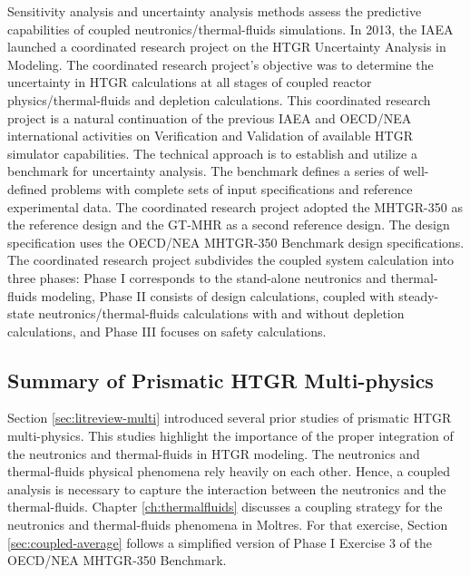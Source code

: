 Sensitivity analysis and uncertainty analysis methods assess the predictive capabilities of coupled neutronics/thermal-fluids simulations.
In 2013, the IAEA launched a coordinated research project \cite{tyobeka_htgr_2011} on the HTGR Uncertainty Analysis in Modeling.
The coordinated research project's objective was to determine the uncertainty in HTGR calculations at all stages of coupled reactor physics/thermal-fluids and depletion calculations.
This coordinated research project is a natural continuation of the previous IAEA and OECD/NEA international activities \cite{iaea_evaluation_2003}\cite{reitsma_oecd-neansc_2008} on Verification and Validation of available HTGR simulator capabilities.
The technical approach is to establish and utilize a benchmark for uncertainty analysis.
The benchmark defines a series of well-defined problems with complete sets of input specifications and reference experimental data.
The coordinated research project adopted the MHTGR-350 as the reference design and the GT-MHR as a second reference design.
The design specification uses the OECD/NEA MHTGR-350 Benchmark \cite{oecd_nea_benchmark_2017} design specifications.
The coordinated research project subdivides the coupled system calculation into three phases: Phase I corresponds to the stand-alone neutronics and thermal-fluids modeling, Phase II consists of design calculations, coupled with steady-state neutronics/thermal-fluids calculations with and without depletion calculations, and Phase III focuses on safety calculations.

\subsection{Summary of Prismatic HTGR Multi-physics}

Section \ref{sec:litreview-multi} introduced several prior studies of prismatic HTGR multi-physics.
This studies highlight the importance of the proper integration of the neutronics and thermal-fluids in HTGR modeling.
The neutronics and thermal-fluids physical phenomena rely heavily on each other.
Hence, a coupled analysis is necessary to capture the interaction between the neutronics and the thermal-fluids.
Chapter \ref{ch:thermalfluids} discusses a coupling strategy for the neutronics and thermal-fluids phenomena in Moltres.
For that exercise, Section \ref{sec:coupled-average} follows a simplified version of Phase I Exercise 3 of the OECD/NEA MHTGR-350 Benchmark.
